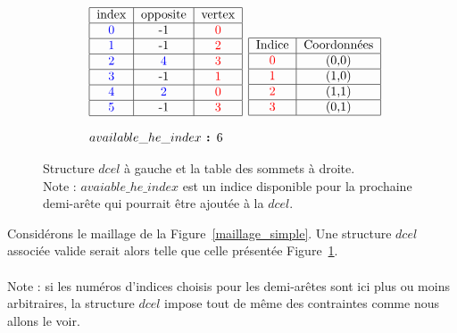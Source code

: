 \documentclass[]{article}
\begin{document}
\begin{figure}[H]
	\[
		\begin{aligned}[c]
			\begin{array}{l}
				\begin{tabular}{|c|c|c|c|}
					\hline
					index         & opposite      & vertex       \\
					\hline
					\color{blue}0 & -1            & \color{red}0 \\
					\hline
					\color{blue}1 & -1            & \color{red}2 \\
					\hline
					\color{blue}2 & \color{blue}4 & \color{red}3 \\
					\hline
					\color{blue}3 & -1            & \color{red}1 \\
					\hline
					\color{blue}4 & \color{blue}2 & \color{red}0 \\
					\hline
					\color{blue}5 & -1            & \color{red}3 \\
					\hline
				\end{tabular} \\\\
				available\_he\_index\textbf{ : }6
			\end{array}
		\end{aligned}
		\begin{aligned}[c]
			\begin{tabular}{|c|c|}
				\hline
				Indice       & Coordonnées \\
				\hline
				\color{red}0 & (0,0)       \\
				\hline
				\color{red}1 & (1,0)       \\
				\hline
				\color{red}2 & (1,1)       \\
				\hline
				\color{red}3 & (0,1)       \\
				\hline
			\end{tabular}
		\end{aligned}
	\]
	\caption{Structure $dcel$ à gauche et la table des sommets à droite.\\Note : $avaiable\_he\_index$ est un indice disponible pour la prochaine demi-arête qui pourrait être ajoutée à la $dcel$.}
	\label{maillage_simple_struct_associee}
\end{figure}

Considérons le maillage de la Figure~\ref{maillage_simple}. Une structure $dcel$ associée valide serait alors telle que celle présentée Figure~\ref{maillage_simple_struct_associee}.\\\\
Note : si les numéros d'indices choisis pour les demi-arêtes sont ici plus ou moins arbitraires, la structure $dcel$ impose tout de même des contraintes comme nous allons le voir.
\end{document}
